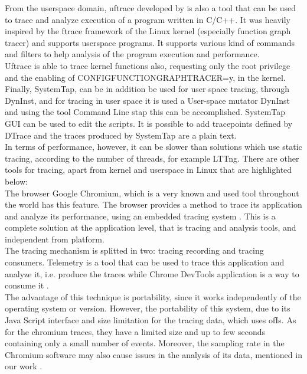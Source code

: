From the userspace domain, uftrace developed by \cite{uftrace} is also a tool that can be used to trace and analyze execution of a program written in C/C++. It was heavily inspired by the ftrace framework of the Linux kernel (especially function graph tracer) and supports userspace programs. It supports various kind of commands and filters to help analysis of the program execution and performance.\\
Uftrace is able to trace kernel functions also, requesting only the root privilege and the enabling of CONFIGFUNCTION\textunderscore GRAPH\textunderscore TRACER=y, in the kernel.\\
Finally, SystemTap, can be in addition be used for user space tracing, through DynInst, and for tracing in user space it is used a User-space mutator DynInst \cite{dyninst} and using the tool Command Line stap this can be accomplished. SystemTap GUI can be used to edit the scripts. It is possible to add tracepoints defined by DTrace and the traces produced by SystemTap are a plain text.\\
In terms of performance, however, it can be slower than solutions which use static tracing, according to the number of threads, for example LTTng.
There are other tools for tracing, apart from kernel and userspace in Linux that are highlighted below:\\
The browser Google Chromium, which is a very known and used tool throughout the world has this feature. The browser provides a method to trace its application and analyze its performance, using an embedded tracing system \cite{chromium_project}. This is a complete solution at the application level, that is tracing and analysis tools, and independent from platform.\\
The tracing mechanism is splitted in two: tracing recording and tracing consumers. Telemetry is a tool that can be used to trace this application and analyze it, i.e. produce the traces while Chrome DevTools application is a way to consume it \cite{trace_chromium}.\\
The advantage of this technique is portability, since it works independently of the operating system or version. However, the portability of this system, due to its Java Script interface and size limitation for the tracing data, which uses ofIs. As for the chromium traces, they have a limited size and up to few seconds containing only a small number of events. Moreover, the sampling rate in the Chromium software may also cause issues in the analysis of its data, mentioned in our work \cite{google_releases}.\\
